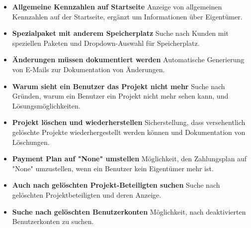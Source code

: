 \begin{itemize}
    \item \textbf{Allgemeine Kennzahlen auf Startseite}
        \newline
        Anzeige von allgemeinen Kennzahlen auf der Startseite, ergänzt um Informationen über Eigentümer.
    \item \textbf{Spezialpaket mit anderem Speicherplatz}
        \newline
        Suche nach Kunden mit speziellen Paketen und Dropdown-Auswahl für Speicherplatz.
    \item \textbf{Änderungen müssen dokumentiert werden}
        \newline
        Automatische Generierung von E-Mails zur Dokumentation von Änderungen.
    \item \textbf{Warum sieht ein Benutzer das Projekt nicht mehr}
        \newline
        Suche nach Gründen, warum ein Benutzer ein Projekt nicht mehr sehen kann, und Lösungsmöglichkeiten.
    \item \textbf{Projekt löschen und wiederherstellen}
        \newline
        Sicherstellung, dass versehentlich gelöschte Projekte wiederhergestellt werden können und Dokumentation von Löschungen.
    \item \textbf{Payment Plan auf "None" umstellen}
        \newline
        Möglichkeit, den Zahlungsplan auf "None" umzustellen, wenn ein Benutzer kein Eigentümer mehr ist.
    \item \textbf{Auch nach gelöschten Projekt-Beteiligten suchen}
        \newline
        Suche nach gelöschten Projektbeteiligten und deren Anzeige.
    \item \textbf{Suche nach gelöschten Benutzerkonten}
        \newline
        Möglichkeit, nach deaktivierten Benutzerkonten zu suchen.
\end{itemize}
\newpage